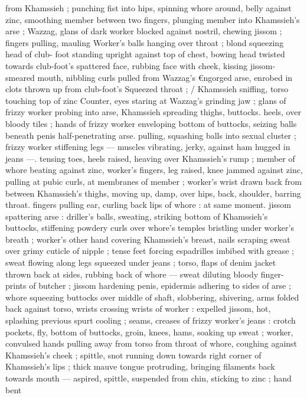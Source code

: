 from Khamssieh ; punching fist into hips, spinning whore around,
belly against zinc, smoothing member between two fingers, plunging
member into Khamssieh's arse ; Wazzag, glans of dark worker
blocked against nostril, chewing jissom ; fingers pulling, mauling
Worker's balls hanging over throat ; blond squeezing head of club-
foot standing upright against top of chest, bowing head twisted
towards club-foot’s spattered face, rubbing face with cheek, kissing
jissom-smeared mouth, nibbling curls pulled from Wazzag's
€ngorged arse, enrobed in clots thrown up from club-foot's
Squeezed throat ; / Khamssieh sniffing, torso touching top of zinc
Counter, eyes staring at Wazzag's grinding jaw ; glans of frizzy
worker probing into arse, Khamssieh spreading thighs, buttocks.
heels, over bloody tiles ; hands of frizzy worker enveloping bottom
of buttocks, seizing balls beneath penis half-penetrating arse.
pulling, squashing balls into sexual cluster ; frizzy worker stiffening
legs --- muscles vibrating, jerky, against ham hugged in jeans ---.
tensing toes, heels raised, heaving over Khamssieh's rump ; member
of whore beating against zinc, worker's fingers, leg raised, knee
jammed against zinc, pulling at pubic curls, at membranes of
member ; worker's wrist drawn back from between Khamssieh's
thighs, moving up, damp, over hips, back, shoulder, barring throat.
fingers pulling ear, curling back lips of whore : at same moment.
jissom spattering arse : driller's balls, sweating, striking bottom of
Khamssieh’s buttocks, stiffening powdery curls over whore's temples
bristling under worker's breath ; worker's other hand covering
Khamssieh's breast, nails scraping sweat over grimy cuticle of nipple
; tense feet forcing espadrilles imbibed with grease ; sweat flowing
along legs squeezed under jeans ; torso, flaps of denim jacket
thrown back at sides, rubbing back of whore --- sweat diluting
bloody finger-prints of butcher ; jissom hardening penis, epidermis
adhering to sides of arse ; whore squeezing buttocks over middle of
shaft, slobbering, shivering, arms folded back against torso, wrists
crossing wrists of worker : expelled jissom, hot, splashing previous
spurt cooling ; seams, creases of frizzy worker's jeans : crotch
pockets, fly, bottom of buttocks, groin, knees, hams, soaking up
sweat ; worker, convulsed hands pulling away from torso from throat
of whore, coughing against Khamssieh's cheek ; spittle, snot
running down towards right corner of Khamssieh’s lips ; thick mauve
tongue protruding, bringing filaments back towards mouth ---
aspired, spittle, suspended from chin, sticking to zinc ; hand bent
